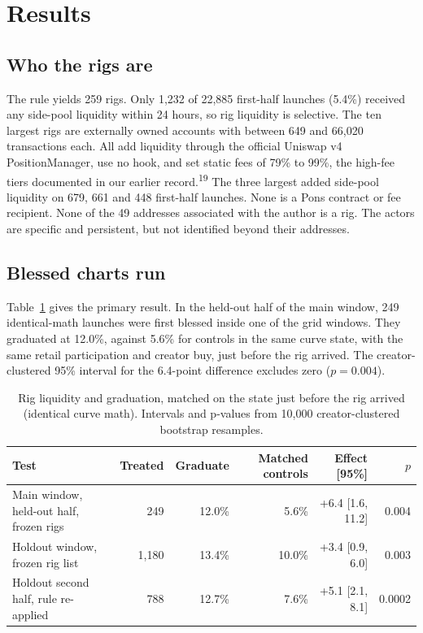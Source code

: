\documentclass{ledger}
\newcommand{\n}[1]{\textsuperscript{#1}}
\begin{document}
\section{Results}\label{results}

\subsection{Who the rigs are}

The rule yields 259 rigs. Only 1,232 of 22,885 first-half launches (5.4\%) received any side-pool liquidity within 24 hours, so rig liquidity is selective. The ten largest rigs are externally owned accounts with between 649 and 66,020 transactions each. All add liquidity through the official Uniswap v4 PositionManager, use no hook, and set static fees of 79\% to 99\%, the high-fee tiers documented in our earlier record.\n{19} The three largest added side-pool liquidity on 679, 661 and 448 first-half launches. None is a Pons contract or fee recipient. None of the 49 addresses associated with the author is a rig. The actors are specific and persistent, but not identified beyond their addresses.

\subsection{Blessed charts run}

Table~\ref{tab:main} gives the primary result. In the held-out half of the main window, 249 identical-math launches were first blessed inside one of the grid windows. They graduated at 12.0\%, against 5.6\% for controls in the same curve state, with the same retail participation and creator buy, just before the rig arrived. The creator-clustered 95\% interval for the 6.4-point difference excludes zero ($p = 0.004$).

\begin{table}[h]
\centering\small
\caption{Rig liquidity and graduation, matched on the state just before the rig arrived (identical curve math). Intervals and p-values from 10,000 creator-clustered bootstrap resamples.}\label{tab:main}
\begin{tabular}{@{}>{\raggedright\arraybackslash}p{4.6cm}rrrrr@{}}
\toprule
Test & Treated & Graduate & Matched controls & Effect [95\%] & $p$ \\
\midrule
Main window, held-out half, frozen rigs & 249 & 12.0\% & 5.6\% & +6.4 [1.6, 11.2] & 0.004 \\
Holdout window, frozen rig list & 1,180 & 13.4\% & 10.0\% & +3.4 [0.9, 6.0] & 0.003 \\
Holdout second half, rule re-applied & 788 & 12.7\% & 7.6\% & +5.1 [2.1, 8.1] & 0.0002 \\
\bottomrule
\end{tabular}
\end{table}
\end{document}
